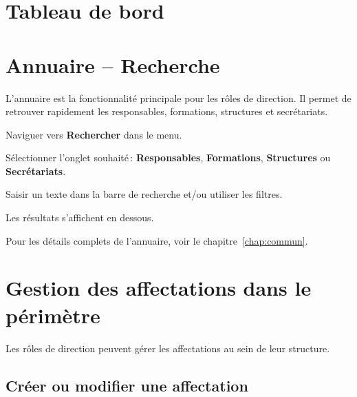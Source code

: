 \section{Tableau de bord}


\section{Annuaire -- Recherche}

L'annuaire est la fonctionnalit\'e principale pour les r\^oles de direction. Il permet de retrouver rapidement les responsables, formations, structures et secr\'etariats.

\begin{steps}
  \item Naviguer vers \textbf{Rechercher} dans le menu.
  \item S\'electionner l'onglet souhait\'e\,: \textbf{Responsables}, \textbf{Formations}, \textbf{Structures} ou \textbf{Secr\'etariats}.
  \item Saisir un texte dans la barre de recherche et/ou utiliser les filtres.
  \item Les r\'esultats s'affichent en dessous.
\end{steps}


Pour les d\'etails complets de l'annuaire, voir le chapitre~\ref{chap:commun}.

\section{Gestion des affectations dans le p\'erim\`etre}

Les r\^oles de direction peuvent g\'erer les affectations au sein de leur structure.

\subsection{Cr\'eer ou modifier une affectation}

